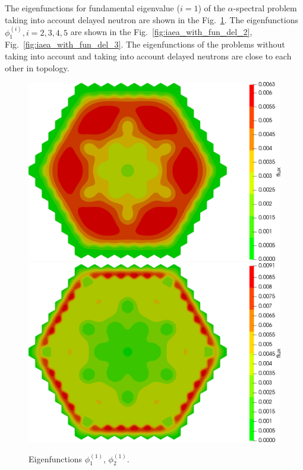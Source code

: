 \documentclass[authoryear]{elsarticle}
\begin{document}
The eigenfunctions for fundamental eigenvalue ($i=1$) of the $\alpha$-spectral problem taking into account delayed neutron are shown in the Fig.~\ref{fig:iaea_with_fun_del_1}. 
The eigenfunctions $\phi_1^{(i)}, i=2,3,4,5$ are shown in the Fig.~\ref{fig:iaea_with_fun_del_2}, Fig.~\ref{fig:iaea_with_fun_del_3}.
The eigenfunctions of the problems without taking into account and taking into account delayed neutrons are close to each other in topology.

\begin{figure}[h]
\begin{center}
	\includegraphics[width=0.49\linewidth]{iaea_with/alpha_delayed_sp3_u1_1.png}
	\includegraphics[width=0.49\linewidth]{iaea_with/alpha_delayed_sp3_u2_1.png}\\
	\caption{Eigenfunctions $\phi_1^{(1)}$, $\phi_2^{(1)}$.}
	\label{fig:iaea_with_fun_del_1}
\end{center}
\end{figure}
\end{document}
